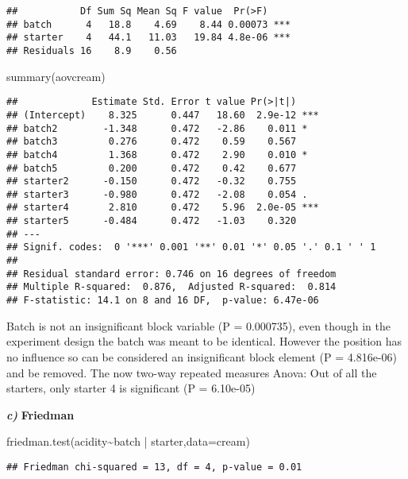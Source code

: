 \documentclass[
]{article}
\newenvironment{Shaded}{\begin{snugshade}}{\end{snugshade}}
\newcommand{\AttributeTok}[1]{\textcolor[rgb]{0.77,0.63,0.00}{#1}}
\newcommand{\FunctionTok}[1]{\textcolor[rgb]{0.00,0.00,0.00}{#1}}
\newcommand{\NormalTok}[1]{#1}
\newcommand{\SpecialCharTok}[1]{\textcolor[rgb]{0.00,0.00,0.00}{#1}}
\begin{document}
\begin{verbatim}
##           Df Sum Sq Mean Sq F value  Pr(>F)    
## batch      4   18.8    4.69    8.44 0.00073 ***
## starter    4   44.1   11.03   19.84 4.8e-06 ***
## Residuals 16    8.9    0.56                    
\end{verbatim}

\begin{Shaded}
\begin{Highlighting}[]
\FunctionTok{summary}\NormalTok{(aovcream)}
\end{Highlighting}
\end{Shaded}

\begin{verbatim}
##             Estimate Std. Error t value Pr(>|t|)    
## (Intercept)    8.325      0.447   18.60  2.9e-12 ***
## batch2        -1.348      0.472   -2.86    0.011 *  
## batch3         0.276      0.472    0.59    0.567    
## batch4         1.368      0.472    2.90    0.010 *  
## batch5         0.200      0.472    0.42    0.677    
## starter2      -0.150      0.472   -0.32    0.755    
## starter3      -0.980      0.472   -2.08    0.054 .  
## starter4       2.810      0.472    5.96  2.0e-05 ***
## starter5      -0.484      0.472   -1.03    0.320    
## ---
## Signif. codes:  0 '***' 0.001 '**' 0.01 '*' 0.05 '.' 0.1 ' ' 1
## 
## Residual standard error: 0.746 on 16 degrees of freedom
## Multiple R-squared:  0.876,  Adjusted R-squared:  0.814 
## F-statistic: 14.1 on 8 and 16 DF,  p-value: 6.47e-06
\end{verbatim}

Batch is not an insignificant block variable (P = 0.000735), even though
in the experiment design the batch was meant to be identical. However
the position has no influence so can be considered an insignificant
block element (P = 4.816e-06) and be removed. The now two-way repeated
measures Anova: Out of all the starters, only starter 4 is significant
(P = 6.10e-05)

\textbf{\emph{c)}} \textbf{Friedman}

\begin{Shaded}
\begin{Highlighting}[]
\FunctionTok{friedman.test}\NormalTok{(acidity}\SpecialCharTok{\textasciitilde{}}\NormalTok{batch }\SpecialCharTok{|}\NormalTok{ starter,}\AttributeTok{data=}\NormalTok{cream)}
\end{Highlighting}
\end{Shaded}

\begin{verbatim}
## Friedman chi-squared = 13, df = 4, p-value = 0.01
\end{verbatim}
\end{document}
